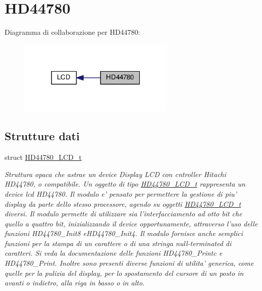 \hypertarget{group___h_d44780}{\section{H\+D44780}
\label{group___h_d44780}
}
Diagramma di collaborazione per H\+D44780\+:\nopagebreak
\begin{figure}[H]
\begin{center}
\leavevmode
\includegraphics[width=211pt]{group___h_d44780}
\end{center}
\end{figure}
\subsection*{Strutture dati}
\begin{DoxyCompactItemize}
\item 
struct \hyperlink{struct_h_d44780___l_c_d__t}{H\+D44780\+\_\+\+L\+C\+D\+\_\+t}
\begin{DoxyCompactList}\small\item\em Struttura opaca che astrae un device Display L\+C\+D con cntroller Hitachi H\+D44780, o compatibile. Un oggetto di tipo \hyperlink{struct_h_d44780___l_c_d__t}{H\+D44780\+\_\+\+L\+C\+D\+\_\+t} rappresenta un device lcd H\+D44780. Il modulo e' pensato per permettere la gestione di piu' display da parte dello stesso processore, agendo su oggetti \hyperlink{struct_h_d44780___l_c_d__t}{H\+D44780\+\_\+\+L\+C\+D\+\_\+t} diversi. Il modulo permette di utilizzare sia l'interfacciamento ad otto bit che quello a quattro bit, inizializzando il device opportunamente, attraverso l'uso delle funzioni H\+D44780\+\_\+\+Init8 e\+H\+D44780\+\_\+\+Init4. Il modulo fornisce anche semplici funzioni per la stampa di un carattere o di una stringa null-\/terminated di caratteri. Si veda la documentazione delle funzioni H\+D44780\+\_\+\+Printc e H\+D44780\+\_\+\+Print. Inoltre sono presenti diverse funzioni di utilita' generica, come quelle per la pulizia del display, per lo spostamento del cursore di un posto in avanti o indietro, alla riga in basso o in alto. \end{DoxyCompactList}\end{DoxyCompactItemize}
